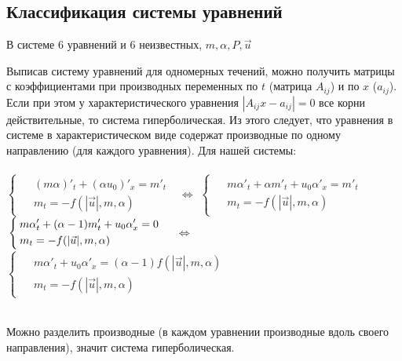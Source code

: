 \subsection{Классификация системы уравнений}
\par В системе 6 уравнений и 6 неизвестных, $m, \alpha, P, \vec{u}$\\
\par Выписав систему уравнений для одномерных течений, можно получить матрицы с коэффициентами при производных переменных по $t$ (матрица $A_{ij}$) и по $x$ ($a_{ij}$). Если при этом у характеристического уравнения $|A_{ij}x-a_{ij}|=0$ все корни действительные, то система гиперболическая. Из этого следует, что уравнения в системе в характеристическом виде содержат производные по одному направлению (для каждого уравнения). Для нашей системы:\\
\bigskip
\\
$
\begin{cases}
\begin{aligned}
&(m\alpha)'_{t}+(\alpha u_{0})'_{x}=m'_{t}\\
&m_{t}=-f(|\vec{u}|, m, \alpha)
\end{aligned}
\end{cases}$
$\Leftrightarrow$
$
\begin{cases}
\begin{aligned}
&m\alpha'_{t}+\alpha m'_{t}+u_{0}\alpha'_{x}=m'_{t}\\
&m_{t}=-f(|\vec{u}|, m, \alpha)
\end{aligned}
\end{cases}$\\
\medskip
$\\
\begin{cases}
\begin{aligned}
&m\alpha'_{t}+(\alpha-1) m'_{t}+u_{0}\alpha'_{x}=0\\
&m_{t}=-f(|\vec{u}|, m, \alpha)
\end{aligned}
\end{cases}$
$\Leftrightarrow$
$
\begin{cases}
\begin{aligned}
&m\alpha'_{t}+u_{0}\alpha'_{x}=(\alpha-1)f(|\vec{u}|, m, \alpha)\\
&m_{t}=-f(|\vec{u}|, m, \alpha)
\end{aligned}
\end{cases}$\\
\bigskip
\\
\par Можно разделить производные (в каждом уравнении производные вдоль своего направления), значит система гиперболическая.